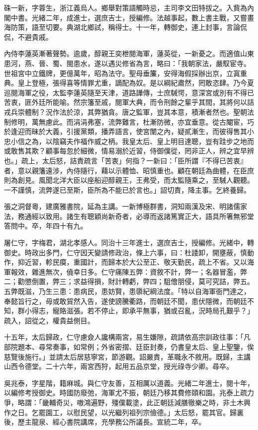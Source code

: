 \begin{pinyinscope}
硃一新，字蓉生，浙江義烏人。鄉舉對策語觸時忌，主司李文田特拔之。入貲為內閣中書。光緒二年，成進士，選庶吉士，授編修。法越事起，數上書主戰，又嘗畫海防策，語至切要。典湖北鄉試，稱得士。十一年，轉御史，連上封事，言論侃侃，不避貴戚。

內侍李蓮英漸著聲勢。逾歲，醇親王奕枻閱海軍，蓮英從，一新憂之。而適值山東患河，燕、晉、蜀、閩患水，遂以遇災修省為言，略曰：「我朝家法，嚴馭宦寺。世祖宮中立鐵牌，更億萬年，昭為法守。聖母垂簾，安得海假採辦出京，立寘重典。皇上登極，張得喜等情罪尤重，謫配為奴。是以綱紀肅然，罔敢恣肆。乃今夏巡閱海軍之役，太監李蓮英隨至天津，道路譁傳，士庶駴愕，意深宮或別有不得已苦衷，匪外廷所能喻。然宗籓至戚，閱軍大典，而令刑餘之輩乎其間，其將何以詰戎兵崇體制？況作法於涼，其弊猶貪。唐之監軍，豈其本意，積漸者然也。聖朝法制修明，萬無慮此。而涓涓弗塞，流弊難言，杜漸防微，亦宜垂意。從古閹宦，巧於逢迎而昧於大義，引援黨類，播弄語言，使宮闈之內，疑貳漸生，而彼得售其小忠小信之為，以陰竊夫作福作威之柄。我皇太后、皇上明目達聰，豈有跬步之地而或敢售其欺？顧事每忽於細微，情易溺於近習，侍御僕從，罔非正人，辨之宜早辨也。」疏上，太后怒，詰責疏言「苦衷」何指？一新曰：「臣所謂『不得已苦衷』者，意以親籓遠涉，內侍隨行，藉以示體恤、昭慎重也。顧在朝廷為曲體，在臣庶則為創見。風聞北洋大臣以座船迎醇親王，王弗受，而太監隨乘之，至駴人觀聽。一不謹慎，流弊遂已至斯，臣所為不能已於言也。」詔切責，降主事。乞終養歸。

張之洞督粵，建廣雅書院，延為主講。一新博極群書，洞知兩漢及宋、明諸儒家法，務通經以致用。諸生有聰穎尚新奇者，必導而返諸篤實正大，語具所箸無邪堂答問中。卒，年四十有九。

屠仁守，字梅君，湖北孝感人。同治十三年進士，選庶吉士，授編修。光緒中，轉御史。時政出多門，仁守因天變請修政治，條上六事，曰：杜諉卸，開壅蔽，慎動作，抑近習，軫民瘼，重國計，而歸本於大公至正、敬天勤民，疏上不省。又以海軍報效，雜進無次，僥幸日多。仁守痛陳五弊：資敘不計，弊一；名器冒濫，弊二；勸懲倒置，弊三；求益得損，財計轉虧，弊四；駔儈朋侵，莫可究詰，弊五。五弊既滋，乃生三患：患病民，患妨賢，患隳紀綱法度。「特以自海軍衙門達之，奉懿旨行之，毋或敢貿然入告，遂使謗騰衢路，而朝廷不聞，患伏隱微，而朝廷不知，群小得志，寵賂滋張。若不停止，即承平無事，猶或召亂，況時局孔艱乎？」疏入，詔從之，權貴益側目。

十五年，太后歸政，仁守慮僉人讒構兩宮，易生嫌隙，疏請依高宗訓政往事：「凡部院題本、尋常奏事，如常例；外省密摺、廷臣封奏，仍書皇太后、皇上聖鑒，俟慈覽後施行。」並請太后居慈寧宮，節游觀。詔嚴責，革職永不敘用。既歸，主講山西令德堂。二十六年，兩宮西狩，起用五品京堂，授光祿寺少卿。尋卒。

吳兆泰，字星階，籍麻城。與仁守友善，互相厲以道義。光緒二年進士，閱十年，以編修考授御史。時國防廢弛，海軍尤不振，朝廷乃移其費修頤和園。兆泰上疏力爭，略謂：「畿輔奇災，嗷鴻遍野，殭僕載塗，此正朝廷減膳徹樂之時，非土木興作之日。乞罷園工，以慰民望，以光繼列祖列宗儉德。」太后怒，罷其官。歸裏後，歷主龍泉、經心書院講席，充學務公所議長。宣統二年，卒。


\end{pinyinscope}
